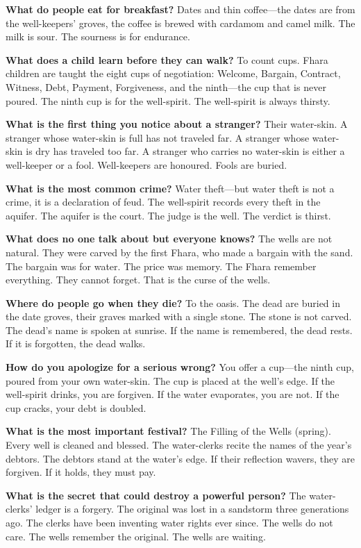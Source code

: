 \vspace{1em}

\begin{almanac}
\textbf{What do people eat for breakfast?} Dates and thin coffee---the dates are from the well-keepers' groves, the coffee is brewed with cardamom and camel milk. The milk is sour. The sourness is for endurance.

\textbf{What does a child learn before they can walk?} To count cups. Fhara children are taught the eight cups of negotiation: Welcome, Bargain, Contract, Witness, Debt, Payment, Forgiveness, and the ninth---the cup that is never poured. The ninth cup is for the well-spirit. The well-spirit is always thirsty.

\textbf{What is the first thing you notice about a stranger?} Their water-skin. A stranger whose water-skin is full has not traveled far. A stranger whose water-skin is dry has traveled too far. A stranger who carries no water-skin is either a well-keeper or a fool. Well-keepers are honoured. Fools are buried.

\textbf{What is the most common crime?} Water theft---but water theft is not a crime, it is a declaration of feud. The well-spirit records every theft in the aquifer. The aquifer is the court. The judge is the well. The verdict is thirst.

\textbf{What does no one talk about but everyone knows?} The wells are not natural. They were carved by the first Fhara, who made a bargain with the sand. The bargain was for water. The price was memory. The Fhara remember everything. They cannot forget. That is the curse of the wells.

\textbf{Where do people go when they die?} To the oasis. The dead are buried in the date groves, their graves marked with a single stone. The stone is not carved. The dead's name is spoken at sunrise. If the name is remembered, the dead rests. If it is forgotten, the dead walks.

\textbf{How do you apologize for a serious wrong?} You offer a cup---the ninth cup, poured from your own water-skin. The cup is placed at the well's edge. If the well-spirit drinks, you are forgiven. If the water evaporates, you are not. If the cup cracks, your debt is doubled.

\textbf{What is the most important festival?} The Filling of the Wells (spring). Every well is cleaned and blessed. The water-clerks recite the names of the year's debtors. The debtors stand at the water's edge. If their reflection wavers, they are forgiven. If it holds, they must pay.

\textbf{What is the secret that could destroy a powerful person?} The water-clerks' ledger is a forgery. The original was lost in a sandstorm three generations ago. The clerks have been inventing water rights ever since. The wells do not care. The wells remember the original. The wells are waiting.
\end{almanac}

